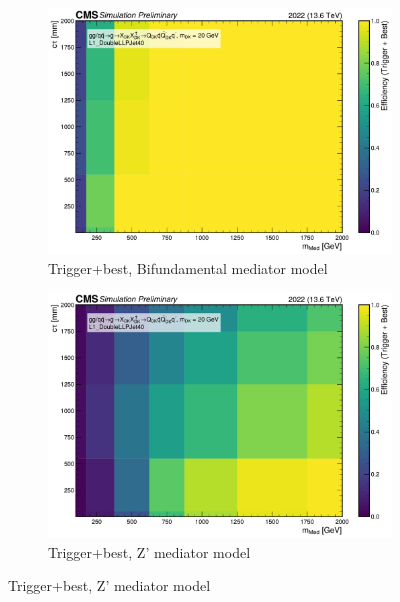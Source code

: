 \begin{figure}[h]
  \vspace{1em}

  \begin{subfigure}[t]{0.45\textwidth}
    \centering
    \includegraphics[width=\linewidth]{images/L1/llp_2D_tchan/trigeffplots2D_L1_efftype-trigplusbest_t-channel_mDark-20_L1_DoubleLLPJet40_study_cloppear.pdf}
    \caption{Trigger+best, Bifundamental mediator model}
    \label{fig:doublellp_trigplusbest_tchan}
  \end{subfigure}
  \hfill
  \begin{subfigure}[t]{0.45\textwidth}
    \centering
    \includegraphics[width=\linewidth]{images/L1/llp_2D_schan/trigeffplots2D_L1_efftype-trigplusbest_s-channel_mDark-20_L1_DoubleLLPJet40_study_cloppear.pdf}
    \caption{Trigger+best, Z' mediator model}
    \label{fig:doublellp_trigplusbest_schan}
  \end{subfigure}


\end{figure}
